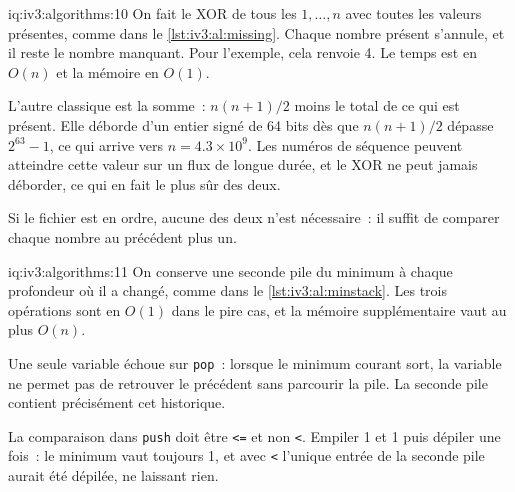 \begin{solution}{iq:iv3:algorithms:10}
On fait le XOR de tous les $1, \dots, n$ avec toutes les valeurs présentes, comme dans le \cref{lst:iv3:al:missing}. Chaque nombre présent s'annule, et il reste le nombre manquant. Pour l'exemple, cela renvoie 4. Le temps est en $O(n)$ et la mémoire en $O(1)$.
\label{lst:iv3:al:missing}

L'autre classique est la somme~: $n(n + 1)/2$ moins le total de ce qui est présent. Elle déborde d'un entier signé de 64 bits dès que $n(n + 1)/2$ dépasse $2^{63} - 1$, ce qui arrive vers $n = 4.3 \times 10^9$. Les numéros de séquence peuvent atteindre cette valeur sur un flux de longue durée, et le XOR ne peut jamais déborder, ce qui en fait le plus sûr des deux.

Si le fichier est en ordre, aucune des deux n'est nécessaire~: il suffit de comparer chaque nombre au précédent plus un.

\end{solution}

\begin{solution}{iq:iv3:algorithms:11}
On conserve une seconde pile du minimum à chaque profondeur où il a changé, comme dans le \cref{lst:iv3:al:minstack}. Les trois opérations sont en $O(1)$ dans le pire cas, et la mémoire supplémentaire vaut au plus $O(n)$.
\label{lst:iv3:al:minstack}

Une seule variable échoue sur \texttt{pop}~: lorsque le minimum courant sort, la variable ne permet pas de retrouver le précédent sans parcourir la pile. La seconde pile contient précisément cet historique.

La comparaison dans \texttt{push} doit être \texttt{<=} et non \texttt{<}. Empiler 1 et 1 puis dépiler une fois~: le minimum vaut toujours 1, et avec \texttt{<} l'unique entrée de la seconde pile aurait été dépilée, ne laissant rien.

\end{solution}

